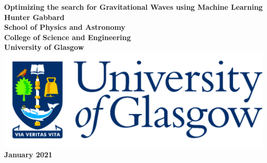 \documentclass[12pt,titlepage,oneside]{book}
\begin{document}
\begin{titlepage}
\centering
\vspace*{3cm}  %
\bfseries\Large
Optimizing the search for Gravitational Waves using Machine Learning \\
\vspace{3cm}
\normalfont\large
Hunter Gabbard\\
\vspace{2cm}
\vspace{2cm}
School of Physics and Astronomy\\
College of Science and Engineering\\
University of Glasgow\\
\vspace{1cm}
\includegraphics[scale=0.125]{GlaLogo.pdf}
\\
\vspace{1cm}
January 2021
\end{titlepage}
\frontmatter  %

\tableofcontents
%
%

\mainmatter %








%

\backmatter  %
%



\end{document}
